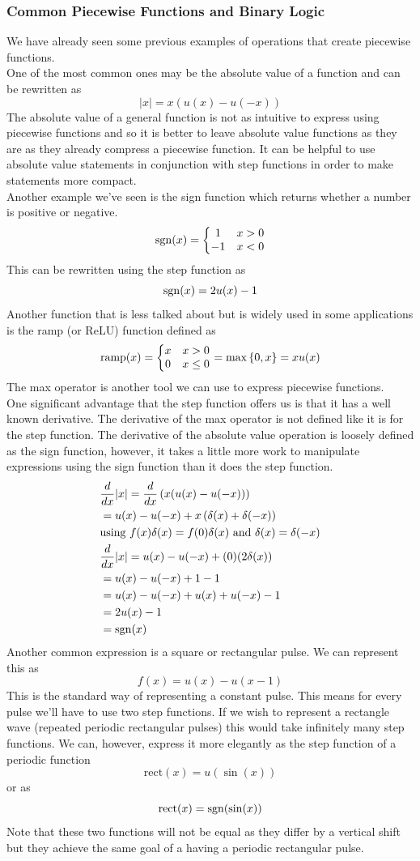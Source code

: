 \documentclass[11pt, fleqn]{article}
\begin{document}
\subsubsection{Common Piecewise Functions and Binary Logic}
We have already seen some previous examples of operations that create piecewise functions.\\
One of the most common ones may be the absolute value of a function and can be rewritten as
$$|x|=x(u(x)-u(-x))$$
The absolute value of a general function is not as intuitive to express using piecewise functions and so it is better to leave absolute value functions as they are as they already compress a piecewise function. It can be helpful to use absolute value statements in conjunction with step functions in order to make statements more compact.\\
Another example we've seen is the sign function which returns whether a number is positive or negative.
$$\operatorname{sgn}(x)=\left\{\begin{matrix} 1 & x>0\\ -1 & x<0 \end{matrix}\right.$$
This can be rewritten using the step function as
$$\operatorname{sgn}(x)=2u(x)-1$$
Another function that is less talked about but is widely used in some applications is the ramp (or ReLU) function defined as
$$\mathrm{ramp}(x)=\left\{\begin{matrix} x & x>0\\ 0 & x\leq 0 \end{matrix}\right.=\max\left\{ 0,x \right\}=xu(x)$$
The max operator is another tool we can use to express piecewise functions.\\
One significant advantage that the step function offers us is that it has a well known derivative. The derivative of the max operator is not defined like it is for the step function. The derivative of the absolute value operation is loosely defined as the sign function, however, it takes a little more work to manipulate expressions using the sign function than it does the step function.
\begin{align*}
    &\frac{d }{d x}|x|=\frac{d }{d x}\left( x(u(x)-u(-x)) \right)\\
    &=u(x)-u(-x)+x\left( \delta(x)+\delta(-x) \right)\\
    &\text{using }f(x)\delta(x)=f(0)\delta(x)\text{ and }\delta(x)=\delta(-x)\\
    &\frac{d }{d x}|x|=u(x)-u(-x)+(0)(2\delta(x))\\
    &=u(x)-u(-x)+1-1\\
    &=u(x)-u(-x)+u(x)+u(-x)-1\\
    &=2u(x)-1\\
    &=\operatorname{sgn}(x)
\end{align*}
Another common expression is a square or rectangular pulse. We can represent this as
$$f(x)=u(x)-u(x-1)$$
This is the standard way of representing a constant pulse. This means for every pulse we'll have to use two step functions. If we wish to represent a rectangle wave (repeated periodic rectangular pulses) this would take infinitely many step functions. We can, however, express it more elegantly as the step function of a periodic function
$$\mathrm{rect}(x)=u(\sin(x))$$
or as
$$\mathrm{rect}(x)=\operatorname{sgn}(\sin(x))$$
Note that these two functions will not be equal as they differ by a vertical shift but they achieve the same goal of a having a periodic rectangular pulse.\\
\end{document}
